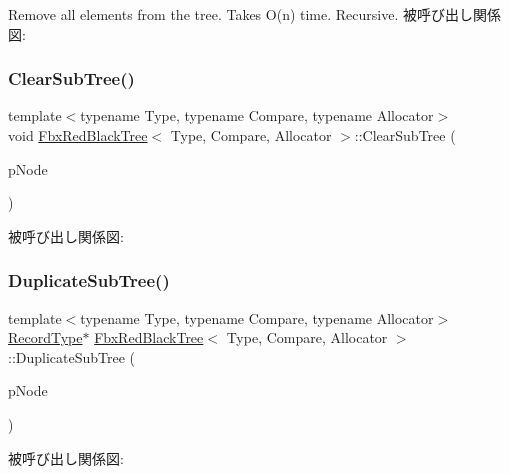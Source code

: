 Remove all elements from the tree. Takes O(n) time. Recursive. 被呼び出し関係図\+:
\mbox{\label{class_fbx_red_black_tree_af958bdb74b133aff94c460e956b78859}} 
\subsubsection{\texorpdfstring{Clear\+Sub\+Tree()}{ClearSubTree()}}
{\footnotesize\ttfamily template$<$typename Type, typename Compare, typename Allocator$>$ \\
void \hyperlink{class_fbx_red_black_tree}{Fbx\+Red\+Black\+Tree}$<$ Type, Compare, Allocator $>$\+::Clear\+Sub\+Tree (\begin{DoxyParamCaption}\item[{\hyperlink{class_fbx_red_black_tree_1_1_record_type}{Record\+Type} $\ast$}]{p\+Node }\end{DoxyParamCaption})\hspace{0.3cm}{\ttfamily [protected]}}

被呼び出し関係図\+:
\mbox{\label{class_fbx_red_black_tree_a11fd717eeb71ff16ef10114a00cc7888}} 
\subsubsection{\texorpdfstring{Duplicate\+Sub\+Tree()}{DuplicateSubTree()}}
{\footnotesize\ttfamily template$<$typename Type, typename Compare, typename Allocator$>$ \\
\hyperlink{class_fbx_red_black_tree_1_1_record_type}{Record\+Type}$\ast$ \hyperlink{class_fbx_red_black_tree}{Fbx\+Red\+Black\+Tree}$<$ Type, Compare, Allocator $>$\+::Duplicate\+Sub\+Tree (\begin{DoxyParamCaption}\item[{const \hyperlink{class_fbx_red_black_tree_1_1_record_type}{Record\+Type} $\ast$}]{p\+Node }\end{DoxyParamCaption})\hspace{0.3cm}{\ttfamily [protected]}}

被呼び出し関係図\+:
\mbox{\label{class_fbx_red_black_tree_ab885c9a32cffb04da71d5dccb70bc945}} 
